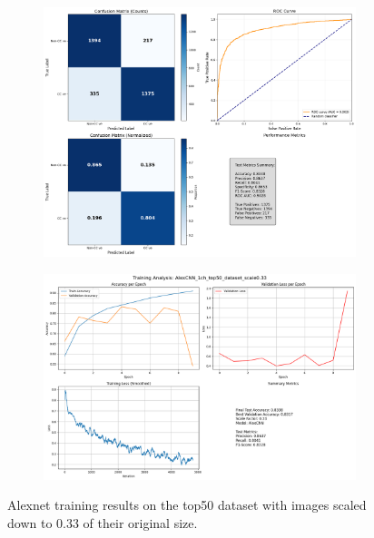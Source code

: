 \documentclass{pracalicmgr}
\begin{document}
\newpage

\begin{figure}[H]
    \centering
    \begin{subfigure}{0.9\textwidth}
        \centering
        \includegraphics[width=\textwidth]{src/AlexCNN_1ch_top50_dataset_scale033.png}
        \label{fig:top5033sub1}
    \end{subfigure}
    
    \vspace{1cm}
    
    \begin{subfigure}{0.9\textwidth}
        \centering
        \includegraphics[width=\textwidth]{src/AlexCNN_1ch_top50_dataset_scale033loss.png}
        \label{fig:top5033sub2}
    \end{subfigure}
    \caption{Alexnet training results on the top50 dataset with images scaled down to 0.33 of their original size.}
    \label{fig:top5033stacked}
\end{figure}
\end{document}

